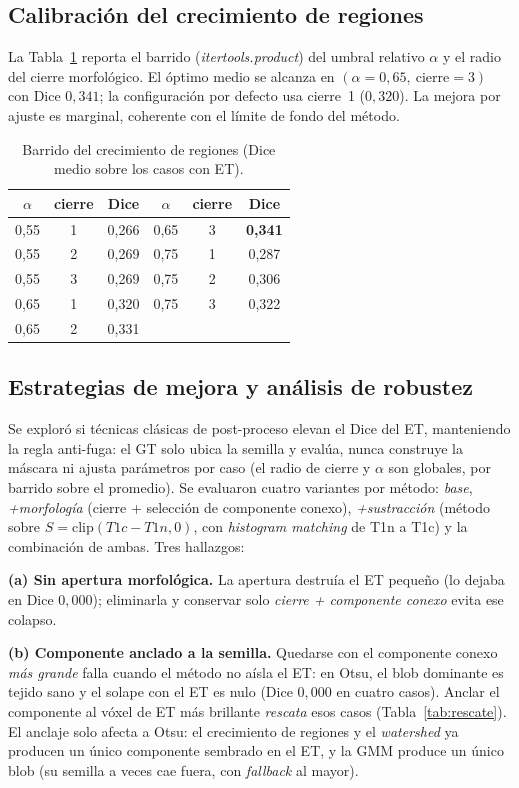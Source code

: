 \documentclass[conference]{IEEEtran}
\begin{document}
\subsection{Calibración del crecimiento de regiones}
La Tabla~\ref{tab:sweep} reporta el barrido
(\textit{itertools.product}) del umbral relativo $\alpha$ y el radio
del cierre morfológico. El óptimo medio se alcanza en
$(\alpha=0{,}65,\ \text{cierre}=3)$ con Dice $0{,}341$; la
configuración por defecto usa cierre~1 ($0{,}320$). La mejora por
ajuste es marginal, coherente con el límite de fondo del método.

\begin{table}[h]
\centering
\caption{Barrido del crecimiento de regiones (Dice medio sobre los
casos con ET).}
\label{tab:sweep}
\begin{tabular}{ccc|ccc}
\toprule
$\alpha$ & cierre & Dice & $\alpha$ & cierre & Dice \\
\midrule
0,55 & 1 & 0,266 & 0,65 & 3 & \textbf{0,341} \\
0,55 & 2 & 0,269 & 0,75 & 1 & 0,287 \\
0,55 & 3 & 0,269 & 0,75 & 2 & 0,306 \\
0,65 & 1 & 0,320 & 0,75 & 3 & 0,322 \\
0,65 & 2 & 0,331 &      &   &       \\
\bottomrule
\end{tabular}
\end{table}

\subsection{Estrategias de mejora y análisis de robustez}
Se exploró si técnicas clásicas de post-proceso elevan el Dice del ET, manteniendo la
regla anti-fuga: el GT solo ubica la semilla y evalúa, nunca construye la máscara ni
ajusta parámetros por caso (el radio de cierre y $\alpha$ son globales, por barrido sobre
el promedio). Se evaluaron cuatro variantes por método: \emph{base}, \emph{+morfología}
(cierre + selección de componente conexo), \emph{+sustracción} (método sobre
$S=\mathrm{clip}(T1c-T1n,0)$, con \textit{histogram matching} de T1n a T1c) y la
combinación de ambas. Tres hallazgos:

\textbf{(a) Sin apertura morfológica.} La apertura destruía el ET pequeño (lo dejaba en
Dice $0{,}000$); eliminarla y conservar solo \emph{cierre + componente conexo} evita ese
colapso.

\textbf{(b) Componente anclado a la semilla.} Quedarse con el componente conexo
\emph{más grande} falla cuando el método no aísla el ET: en Otsu, el blob dominante es
tejido sano y el solape con el ET es nulo (Dice $0{,}000$ en cuatro casos). Anclar el
componente al vóxel de ET más brillante \emph{rescata} esos casos
(Tabla~\ref{tab:rescate}). El anclaje solo afecta a Otsu: el crecimiento de regiones y
el \textit{watershed} ya producen un único componente sembrado en el ET, y la GMM produce
un único blob (su semilla a veces cae fuera, con \textit{fallback} al mayor).
\end{document}
